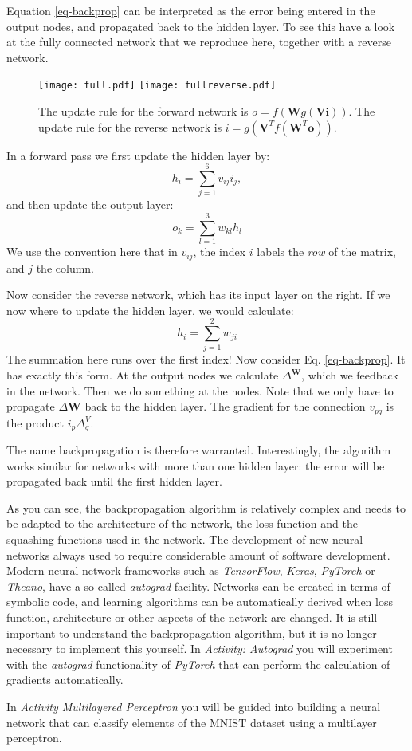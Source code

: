    Equation \ref{eq-backprop} can be interpreted as the error being entered in the output nodes, and propagated back to the hidden layer. To see this have a look at
    the fully connected network that we reproduce here, together with a reverse network.

    \begin{figure}[!ht]
      \begin{center}
        \texttt{[image: full.pdf]}
        \texttt{[image: fullreverse.pdf]}
      \end{center}
      \caption{The update rule for the forward network is $o = f( \boldsymbol{W} g (\boldsymbol{V} \boldsymbol{i}))$. The update rule for the
        reverse network is $i = g(\boldsymbol{V}^T f(\boldsymbol{W}^T \boldsymbol{o}))$.}
    \end{figure}

    In a forward pass we first update the hidden layer by:
    $$
    h_i = \sum^6_{j=1}v_{ij}i_j,
    $$
    and then update the output layer:
    $$
    o_k = \sum^3_{l=1} w_{kl}h_l
    $$
    We use the convention here that in $v_{ij}$, the index $i$ labels the \emph{row} of the matrix, and $j$ the column.

    Now consider the reverse network, which has its input layer on the right. If we now where to update the hidden layer, we would
    calculate:
    $$
    h_i = \sum^2_{j=1} w_{ji}
    $$
    The summation here runs over the first index! Now consider Eq. \ref{eq-backprop}. It has exactly this form. At the output nodes we calculate
    $\Delta^{\boldsymbol{W}}$, which we feedback in the network. Then we do something at the nodes. Note that we only have to propagate $\Delta{\boldsymbol{W}}$
    back to the hidden layer. The gradient for the connection $v_{pq}$ is the product $i_p \Delta^{V}_q$.

    The name backpropagation is therefore warranted. Interestingly, the algorithm works similar for networks with more than one hidden layer: the error will
    be propagated back until the first hidden layer.

    As you can see, the backpropagation algorithm is relatively complex and needs to be adapted to the architecture of the network, the loss function and the
    squashing functions used in the network. The development of new neural networks always used to require  considerable amount of software development. Modern
    neural network frameworks such as \emph{TensorFlow}, \emph{Keras}, \emph{PyTorch} or \emph{Theano}, have a so-called \emph{autograd} facility. Networks
    can be created in terms of symbolic code, and learning algorithms can be automatically derived when loss function, architecture or other aspects of the network
    are changed. It is still important to understand the backpropagation algorithm, but it is no longer necessary to implement this yourself.
    In \emph{Activity: Autograd} you will experiment with the \emph{autograd} functionality of \emph{PyTorch} that can perform the calculation of gradients automatically.

    In \emph{Activity Multilayered Perceptron} you will be guided into building a neural network that can classify elements of the MNIST dataset using a multilayer perceptron.
  
  



  
